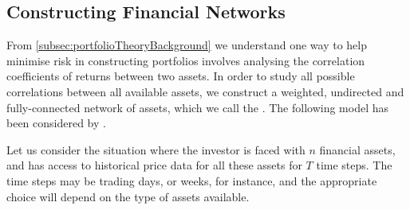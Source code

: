 \subsection{Constructing Financial Networks}
\label{subsec:financialNetworksConstructionBackground}

From \cref{subsec:portfolioTheoryBackground} we understand one way to help minimise risk in constructing portfolios involves analysing the correlation coefficients of returns between two assets.
In order to study all possible correlations between all available assets, we construct a weighted, undirected and fully-connected network of assets, which we call the . The following model has been considered by \cite{PGR+99,OCK+02,OKK03,FPM+10,MG13}.

Let us consider the situation where the investor is faced with $n$ financial assets, and has access to historical price data for all these assets for $T$ time steps.
The time steps may be trading days, or weeks, for instance, and the appropriate choice will depend on the type of assets available.

